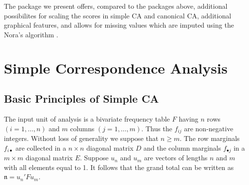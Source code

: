\documentclass[article]{Z}
\begin{document}
The  package we present offers, compared to the packages above, additional possibilites for scaling the scores in
simple CA and canonical CA, additional graphical features, and allows for missing values which are imputed using the Nora's algorithm \citep{Nora:75}.

\section{Simple Correspondence Analysis}
\label{sec:sca}
\subsection{Basic Principles of Simple CA}
\label{sec:basicca}
The input unit of analysis is a bivariate frequency table $F$ having $n$ rows $(i=1,\ldots,n)$ and $m$ columns $(j=1,\ldots,m)$. Thus the \(f_{ij}\) are non-negative integers. Without loss of generality we suppose that $n\geq m$. The row marginals $f_{i\bullet}$ are collected in a $n \times n$ diagonal matrix $D$ and the column marginals $f_{\bullet j}$ in a $m \times m$ diagonal matrix $E$. Suppose \(u_n\) and \(u_m\) are vectors of lengths \(n\) and \(m\) with all elements equal to 1. It follows that the grand total can be written as $\mathfrak{n}=u_n'Fu_m$.
\end{document}
